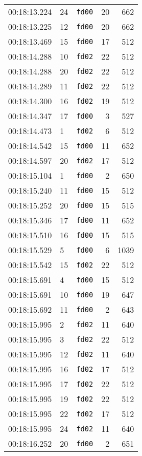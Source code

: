 \documentclass{article}
\begin{document}
\begin{longtable}{lllrr}
00:18:13.224 & 24 & \texttt{fd00} & 20 & 662 \\
00:18:13.225 & 12 & \texttt{fd00} & 20 & 662 \\
00:18:13.469 & 15 & \texttt{fd00} & 17 & 512 \\
00:18:14.288 & 10 & \texttt{fd02} & 22 & 512 \\
00:18:14.288 & 20 & \texttt{fd02} & 22 & 512 \\
00:18:14.289 & 11 & \texttt{fd02} & 22 & 512 \\
00:18:14.300 & 16 & \texttt{fd02} & 19 & 512 \\
00:18:14.347 & 17 & \texttt{fd00} & 3 & 527 \\
00:18:14.473 & 1 & \texttt{fd02} & 6 & 512 \\
00:18:14.542 & 15 & \texttt{fd00} & 11 & 652 \\
00:18:14.597 & 20 & \texttt{fd02} & 17 & 512 \\
00:18:15.104 & 1 & \texttt{fd00} & 2 & 650 \\
00:18:15.240 & 11 & \texttt{fd00} & 15 & 512 \\
00:18:15.252 & 20 & \texttt{fd00} & 15 & 515 \\
00:18:15.346 & 17 & \texttt{fd00} & 11 & 652 \\
00:18:15.510 & 16 & \texttt{fd00} & 15 & 515 \\
00:18:15.529 & 5 & \texttt{fd00} & 6 & 1039 \\
00:18:15.542 & 15 & \texttt{fd02} & 22 & 512 \\
00:18:15.691 & 4 & \texttt{fd00} & 15 & 512 \\
00:18:15.691 & 10 & \texttt{fd00} & 19 & 647 \\
00:18:15.692 & 11 & \texttt{fd00} & 2 & 643 \\
00:18:15.995 & 2 & \texttt{fd02} & 11 & 640 \\
00:18:15.995 & 3 & \texttt{fd02} & 22 & 512 \\
00:18:15.995 & 12 & \texttt{fd02} & 11 & 640 \\
00:18:15.995 & 16 & \texttt{fd02} & 17 & 512 \\
00:18:15.995 & 17 & \texttt{fd02} & 22 & 512 \\
00:18:15.995 & 19 & \texttt{fd02} & 22 & 512 \\
00:18:15.995 & 22 & \texttt{fd02} & 17 & 512 \\
00:18:15.995 & 24 & \texttt{fd02} & 11 & 640 \\
00:18:16.252 & 20 & \texttt{fd00} & 2 & 651 \\

\end{longtable}
\end{document}
